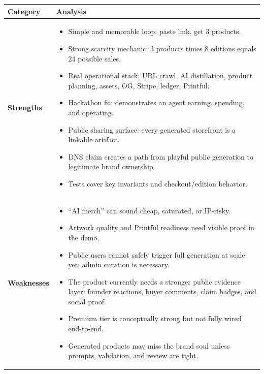 \documentclass[11pt]{article}
\begin{document}
\begin{longtable}{p{}p{}}
\toprule
\textbf{Category} & \textbf{Analysis} \\
\midrule
\endhead

\textbf{Strengths} &
\begin{itemize}
  \item Simple and memorable loop: paste link, get 3 products.
  \item Strong scarcity mechanic: 3 products times 8 editions equals 24 possible sales.
  \item Real operational stack: URL crawl, AI distillation, product planning, assets, OG, Stripe, ledger, Printful.
  \item Hackathon fit: demonstrates an agent earning, spending, and operating.
  \item Public sharing surface: every generated storefront is a linkable artifact.
  \item DNS claim creates a path from playful public generation to legitimate brand ownership.
  \item Tests cover key invariants and checkout/edition behavior.
\end{itemize}
\\

\textbf{Weaknesses} &
\begin{itemize}
  \item ``AI merch'' can sound cheap, saturated, or IP-risky.
  \item Artwork quality and Printful readiness need visible proof in the demo.
  \item Public users cannot safely trigger full generation at scale yet; admin curation is necessary.
  \item The product currently needs a stronger public evidence layer: founder reactions, buyer comments, claim badges, and social proof.
  \item Premium tier is conceptually strong but not fully wired end-to-end.
  \item Generated products may miss the brand soul unless prompts, validation, and review are tight.
\end{itemize}
\\


\end{longtable}
\end{document}
